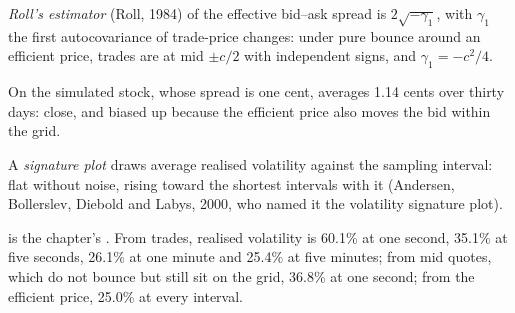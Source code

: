 \begin{definition}\label{def:qm:high-frequency-econometrics:roll}
\emph{Roll's estimator} (Roll, 1984) of the effective bid--ask spread is $2\sqrt{-\gamma_1}$, with $\gamma_1$ the first autocovariance of trade-price
changes: under pure bounce around an efficient price, trades are at mid $\pm c/2$ with independent signs, and $\gamma_1 = -c^2/4$.
\end{definition}

On the simulated stock, whose spread is one cent,  averages 1.14 cents over thirty days: close, and biased up because the efficient price also
moves the bid within the grid.

\begin{definition}\label{def:qm:high-frequency-econometrics:signature}
A \emph{signature plot} draws average realised volatility against the sampling interval: flat
without noise, rising toward the shortest intervals with it (Andersen, Bollerslev, Diebold and Labys, 2000, who named it the volatility signature plot).
\end{definition}

 is the chapter's . From trades, realised volatility is 60.1\% at one second, 35.1\% at five
seconds, 26.1\% at one minute and 25.4\% at five minutes; from mid quotes, which do not bounce but still sit on the grid, 36.8\% at one second; from the
efficient price, 25.0\% at every interval.

